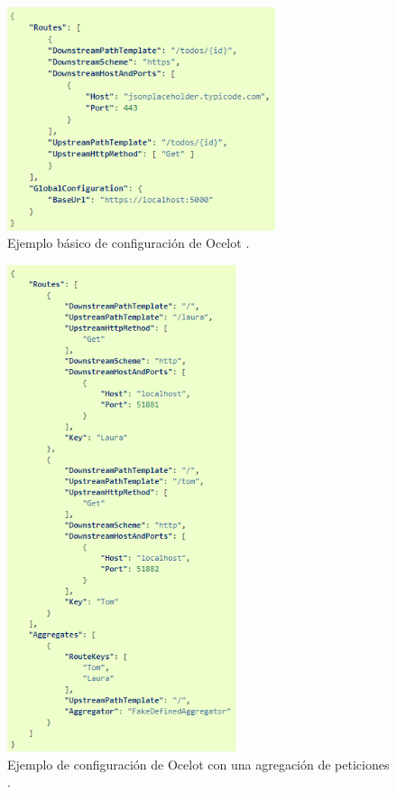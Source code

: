 \documentclass[11pt,spanish,listoffigures]{tfgetsinf}
\begin{document}
\begin{figure}[ht]
\centering
\includegraphics[width=0.7\textwidth]{imagenes/configuracionBasicaOcelot}
\caption[Ejemplo básico de configuración de Ocelot.]{Ejemplo básico de configuración de Ocelot \cite{Ocelot_documentacion}.}
	\label{configuracionBasicaOcelot}
\end{figure}

\begin{figure}[H] %
\centering
\includegraphics[width=0.6\textwidth]{imagenes/configuracionAgregacionOcelot}
\caption[Ejemplo de configuración de Ocelot con una agregación de peticiones.]{Ejemplo de configuración de Ocelot con una agregación de peticiones \cite{Ocelot_documentacion}.}
	\label{configuracionAgregacionOcelot}
\end{figure}
\end{document}
